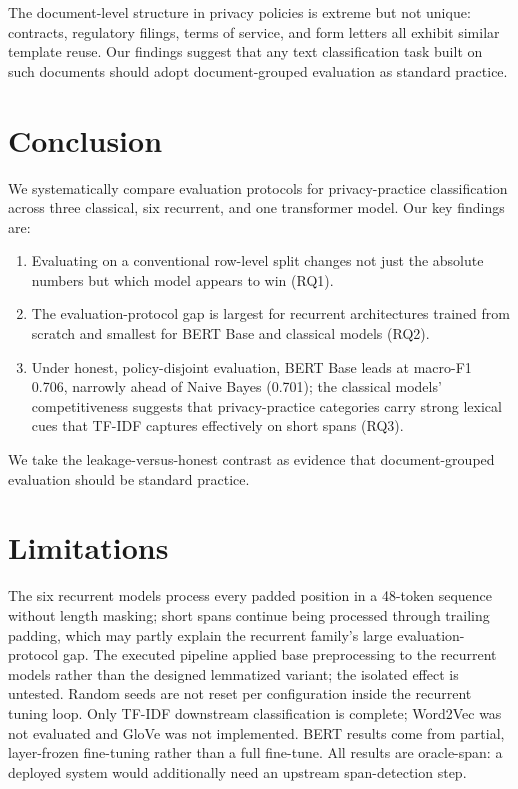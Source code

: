 \documentclass[11pt]{article}
\begin{document}
The document-level structure in privacy policies is extreme but not unique: contracts, regulatory filings, terms of service, and form letters all exhibit similar template reuse. Our findings suggest that any text classification task built on such documents should adopt document-grouped evaluation as standard practice.

\section{Conclusion}

We systematically compare evaluation protocols for privacy-practice classification across three classical, six recurrent, and one transformer model. Our key findings are:

\begin{enumerate}
\item Evaluating on a conventional row-level split changes not just the absolute numbers but which model appears to win (RQ1).
\item The evaluation-protocol gap is largest for recurrent architectures trained from scratch and smallest for BERT Base and classical models (RQ2).
\item Under honest, policy-disjoint evaluation, BERT Base leads at macro-F1 0.706, narrowly ahead of Naive Bayes (0.701); the classical models' competitiveness suggests that privacy-practice categories carry strong lexical cues that TF-IDF captures effectively on short spans (RQ3).
\end{enumerate}

We take the leakage-versus-honest contrast as evidence that document-grouped evaluation should be standard practice.

\section{Limitations}

The six recurrent models process every padded position in a 48-token sequence without length masking; short spans continue being processed through trailing padding, which may partly explain the recurrent family's large evaluation-protocol gap. The executed pipeline applied base preprocessing to the recurrent models rather than the designed lemmatized variant; the isolated effect is untested. Random seeds are not reset per configuration inside the recurrent tuning loop. Only TF-IDF downstream classification is complete; Word2Vec was not evaluated and GloVe was not implemented. BERT results come from partial, layer-frozen fine-tuning rather than a full fine-tune. All results are oracle-span: a deployed system would additionally need an upstream span-detection step.
\end{document}
